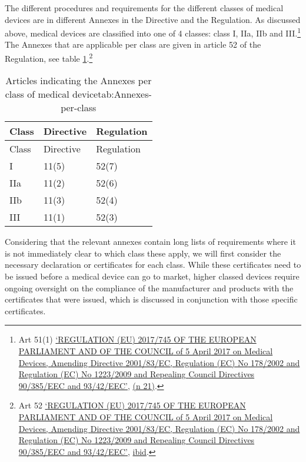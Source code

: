 \documentclass[
]{scrartcl}
\begin{document}
The different procedures and requirements for the different classes of medical devices are in different Annexes in the Directive and the Regulation. As discussed above, medical devices are classified into one of 4 classes: class I, IIa, IIb and III.\footnote{Art 51(1) \protect\hyperlink{ref-REGULATIONEU2017a}{{`{REGULATION} ({EU}) 2017/745 {OF THE EUROPEAN PARLIAMENT AND OF THE COUNCIL} of 5 {April} 2017 on Medical Devices, Amending {Directive} 2001/83/{EC}, {Regulation} ({EC}) {No} 178/2002 and {Regulation} ({EC}) {No} 1223/2009 and Repealing {Council Directives} 90/385/{EEC} and 93/42/{EEC}'}}, \protect\hyperlink{ref-REGULATIONEU2017a}{(n 21)}.} The Annexes that are applicable per class are given in article 52 of the Regulation, see table \protect\hyperlink{tab:Annexes-per-class}{1}.\footnote{Art 52 \protect\hyperlink{ref-REGULATIONEU2017a}{{`{REGULATION} ({EU}) 2017/745 {OF THE EUROPEAN PARLIAMENT AND OF THE COUNCIL} of 5 {April} 2017 on Medical Devices, Amending {Directive} 2001/83/{EC}, {Regulation} ({EC}) {No} 178/2002 and {Regulation} ({EC}) {No} 1223/2009 and Repealing {Council Directives} 90/385/{EEC} and 93/42/{EEC}'}}, \protect\hyperlink{ref-REGULATIONEU2017a}{ibid}.}

\hypertarget{tab:Annexes-per-class}{}
\begin{longtable}[]{@{}lll@{}}
\caption{Articles indicating the Annexes per class of medical device\protect\hypertarget{tab:Annexes-per-class}{}{tab:Annexes-per-class}}\tabularnewline
\toprule
Class & Directive & Regulation \\
\midrule
\endfirsthead
\toprule
Class & Directive & Regulation \\
\midrule
\endhead
I & 11(5) & 52(7) \\
IIa & 11(2) & 52(6) \\
IIb & 11(3) & 52(4) \\
III & 11(1) & 52(3) \\
\bottomrule
\end{longtable}

Considering that the relevant annexes contain long lists of requirements where it is not immediately clear to which class these apply, we will first consider the necessary declaration or certificates for each class. While these certificates need to be issued before a medical device can go to market, higher classed devices require ongoing oversight on the compliance of the manufacturer and products with the certificates that were issued, which is discussed in conjunction with those specific certificates.
\end{document}
